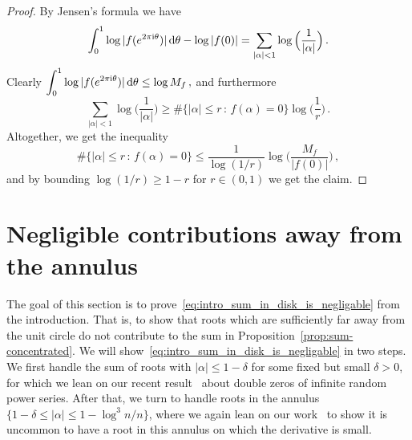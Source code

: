 \documentclass[11pt]{amsart}
\theoremstyle{remark}
\theoremstyle{definition}
\newcommand{\I}{{\rm i}}
\begin{document}
    \begin{proof}
        By Jensen's formula we have 
        \[
        \int_{0}^{1} \log|f(e^{2\pi\I\theta})|\, {\rm d}\theta - \log|f(0)| = \sum_{|\alpha|<1} \log\Big(\frac{1}{|\alpha|}\Big) \, .
        \]
        Clearly
        $
        \displaystyle \int_{0}^{1} \log|f(e^{2\pi\I\theta})|\, {\rm d}\theta \le \log M_f \, , 
        $
        and furthermore
        \[
        \sum_{|\alpha|<1} \log\Big(\frac{1}{|\alpha|}\Big) \ge \#\big\{|\alpha|\le r \, : \, f(\alpha) = 0\big\} \log\Big(\frac{1}{r}\Big) \, .
        \]
        Altogether, we get the inequality
        \[
        \#\big\{|\alpha|\le r \, : \, f(\alpha) = 0\big\} \le \frac{1}{\log(1/r)}\log\Big(\frac{M_f}{|f(0)|}\Big) \, ,
        \]
        and by bounding $\log(1/r) \geq 1 - r$ for $r\in(0,1)$ we get the claim.
    \end{proof}


    \section{Negligible contributions away from the annulus}
    \label{sec:negligible_contributions}
    \noindent
    The goal of this section is to prove~\eqref{eq:intro_sum_in_disk_is_negligable} from the introduction. That is, to show that roots which are sufficiently far away from the unit circle do not contribute to the sum in Proposition~\ref{prop:sum-concentrated}. We will show~\eqref{eq:intro_sum_in_disk_is_negligable} in two steps. We first handle the sum of roots with $|\alpha|\le 1-\delta$ for some fixed but small $\delta>0$, for which we lean on our recent result~\cite[Theorem~1.3]{Michelen-Yakir-root-separation} about double zeros of infinite random power series. After that, we turn to handle roots in the annulus $\{ 1-\delta \le |\alpha| \le 1-\log^3 n /n\}$, where we again lean on our work~\cite{Michelen-Yakir-root-separation} to show it is uncommon to have a root in this annulus on which the derivative is small.
    
\end{document}
